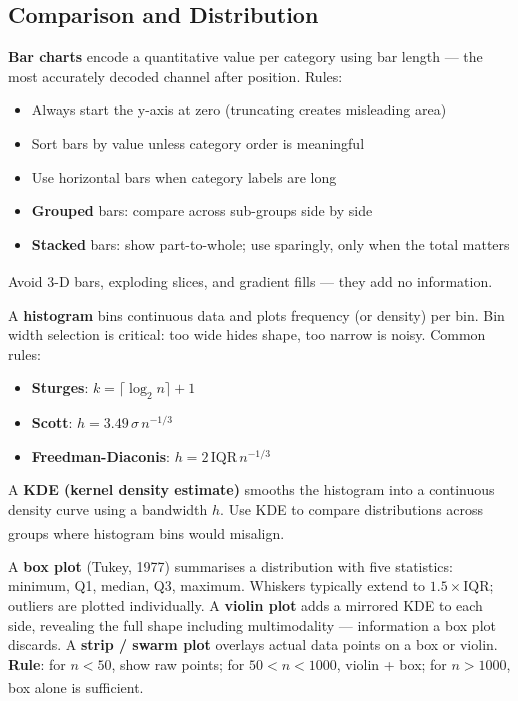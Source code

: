 \subsection{Comparison and Distribution}

\begin{tcbitemize}[ skin=sectionraster ]
    \tcbitem[title={Bar and Column Charts}, raster multicolumn=3]
    \textbf{Bar charts} encode a quantitative value per category using bar length ---
    the most accurately decoded channel after position. Rules:
    \begin{itemize}
        \item Always start the y-axis at zero (truncating creates misleading area)
        \item Sort bars by value unless category order is meaningful
        \item Use horizontal bars when category labels are long
        \item \textbf{Grouped} bars: compare across sub-groups side by side
        \item \textbf{Stacked} bars: show part-to-whole; use sparingly, only when
              the total matters
    \end{itemize}
    Avoid 3-D bars, exploding slices, and gradient fills --- they add no
    information\textsuperscript{\cite[][pp.~60--75]{brucePracticalStatisticsData2017}}.

    \tcbitem[title={Histograms and Density Plots}, raster multicolumn=3]
    A \textbf{histogram} bins continuous data and plots frequency (or density) per bin.
    Bin width selection is critical: too wide hides shape, too narrow is noisy.
    Common rules:
    \begin{itemize}
        \item \textbf{Sturges}: $k = \lceil \log_2 n \rceil + 1$
        \item \textbf{Scott}: $h = 3.49\,\hat{\sigma}\,n^{-1/3}$
        \item \textbf{Freedman-Diaconis}: $h = 2\,\text{IQR}\,n^{-1/3}$
    \end{itemize}
    A \textbf{KDE (kernel density estimate)} smooths the histogram into a continuous
    density curve using a bandwidth $h$. Use KDE to compare distributions across
    groups where histogram bins would
    misalign\textsuperscript{\cite[][pp.~45--50]{downeyThinkStatsExploratory2015}}.

    \tcbitem[title={Box Plots and Violin Plots}, raster multicolumn=3]
    A \textbf{box plot} (Tukey, 1977) summarises a distribution with five statistics:
    minimum, Q1, median, Q3, maximum. Whiskers typically extend to
    $1.5\times\text{IQR}$; outliers are plotted individually.
    A \textbf{violin plot} adds a mirrored KDE to each side, revealing the full shape
    including multimodality --- information a box plot discards.
    A \textbf{strip / swarm plot} overlays actual data points on a box or violin.
    \textbf{Rule}: for $n < 50$, show raw points; for $50 < n < 1000$, violin +
    box; for $n > 1000$, box alone is
    sufficient\textsuperscript{\cite[][pp.~52--55]{downeyThinkStatsExploratory2015}}.


\end{tcbitemize}
